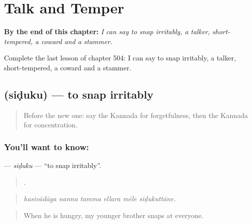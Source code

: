 
\chapter{Talk and Temper}
\label{ch:ka-talk-and-temper}

\begin{chapteropening}
\textbf{By the end of this chapter:} \emph{I can say to snap irritably, a talker, short-tempered, a coward and a stammer.}

Complete the last lesson of chapter 504: I can say to snap irritably, a talker, short-tempered, a coward and a stammer.
\end{chapteropening}

\section[\texorpdfstring{\kn{ಸಿಡುಕು} (siḍuku)}{ಸಿಡುಕು (siḍuku)}]{ (siḍuku) — to snap irritably}

\label{lesson:KA-C504-siduku}



\begin{quote}
Before the new one: say the Kannada for forgetfulness, then the Kannada for concentration.
\end{quote}

\subsection*{You'll want to know: }
\textbf{} — \emph{siḍuku} — \textquotedblleft{}to snap irritably\textquotedblright{}.

\begin{quote}
     .
\end{quote}

\begin{quote}
\emph{hasivādāga nanna tamma ellara mēle siḍukuttāne.}
\end{quote}

\begin{quote}
When he is hungry, my younger brother snaps at everyone.
\end{quote}

